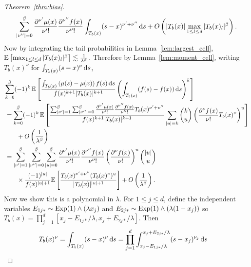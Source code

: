 \begin{proof}[Theorem~\ref{thm:bias}]
\begin{align*}
    \sum_{|\nu''|=0}^{\flbeta}
    \frac{\partial^{\nu'} \mu(x)}{\nu' !}
    \frac{\partial^{\nu''} f(x)}{\nu'' !}
    \int_{T_b(x)} (s-x)^{\nu' + \nu''} \diff s
    + O \left( |T_b(x)| \max_{1 \leq l \leq d} |T_b(x)_l|^\beta \right).
  \end{align*}
  Now by integrating the tail probabilities in Lemma~\ref{lem:largest_cell},
  $ \mathbb{E} \left[ \max_{1 \leq l \leq d} |T_b(x)_l|^\beta \right]
  \lesssim \frac{1}{\lambda^\beta}$.
  Therefore by Lemma~\ref{lem:moment_cell},
  writing $T_b(x)^\nu$ for $\int_{T_b(x)} (s-x)^\nu \,\mathrm{d}s$,
  \begin{align*}
    &\sum_{k=0}^{\flbeta}
    (-1)^k \,
    \E \left[
      \frac{\int_{T_b(x)} \left( \mu(s) - \mu(x) \right) f(s) \diff s}
      {f(x)^{k+1} |T_b(x)|^{k+1}}
      \left(
        \int_{T_b(x)} (f(s) - f(x)) \diff s
      \right)^k
    \right] \\
    &\,=
    \sum_{k=0}^{\flbeta}
    (-1)^k \,
    \E
    \left[
      \frac{
        \sum_{|\nu'|=1}^{\flbeta}
        \sum_{|\nu''|=0}^{\flbeta}
        \frac{\partial^{\nu'} \mu(x)}{\nu' !}
        \frac{\partial^{\nu''} f(x)}{\nu'' !}
        T_b(x)^{\nu' + \nu''}
      }{f(x)^{k+1} |T_b(x)|^{k+1}}
      \sum_{|u| = k}
      \binom{k}{u}
      \left(
        \frac{\partial^\nu f(x)}{\nu !}
        T_b(x)^\nu
      \right)^u
    \right] \\
    &\qquad+
    O \left(
      \frac{1}{\lambda^\beta}
    \right) \\
    &\,=
    \sum_{|\nu'|=1}^{\flbeta}
    \sum_{|\nu''|=0}^{\flbeta}
    \sum_{|u|=0}^{\flbeta}
    \frac{\partial^{\nu'} \mu(x)}{\nu' !}
    \frac{\partial^{\nu''} f(x)}{\nu'' !}
    \left( \frac{\partial^\nu f(x)}{\nu !} \right)^u
    \binom{|u|}{u} \\
    &\qquad\times
    \frac{(-1)^{|u|}}{f(x)^{|u|+1}}
    \E \left[
      \frac{ T_b(x)^{\nu' + \nu''} (T_b(x)^\nu)^u}{|T_b(x)|^{|u|+1}}
    \right]
    + O \left(
      \frac{1}{\lambda^\beta}
    \right) .
  \end{align*}
  Now we show this is a polynomial in $\lambda$.
  For $1 \leq j \leq d$, define the independent variables
  $E_{1j*} \sim \operatorname{Exp}(1) \wedge (\lambda x_j)$
  and $E_{2j*} \sim \operatorname{Exp}(1) \wedge (\lambda (1-x_j))$
  so
  $T_b(x) = \prod_{j=1}^{d} [x_j - E_{1j*} / \lambda, x_j + E_{2j*} / \lambda]$.
  Then
  \begin{align*}
    T_b(x)^\nu
    &=
    \int_{T_b(x)} (s-x)^\nu \diff s
    = \prod_{j=1}^d
    \int_{x_j - E_{1j*}/\lambda}^{x_j+E_{2j*}/\lambda}
    (s - x_j)^{\nu_j} \diff s

\end{align*}
\end{proof}
